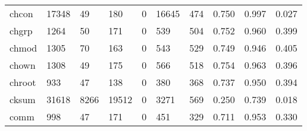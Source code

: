 \begin{longtable}{lp{2.0cm}p{2.0cm}p{2.0cm}p{2.0cm}p{2.0cm}p{2.0cm}p{2.0cm}p{2.0cm}p{2.0cm}}
chcon     &                  17348 &                                 49 &                               180 &                                0 &                             16645 &                             474 &                                   0.750 &                                  0.997 &                                0.027 \\
chgrp     &                   1264 &                                 50 &                               171 &                                0 &                               539 &                             504 &                                   0.752 &                                  0.960 &                                0.399 \\
chmod     &                   1305 &                                 70 &                               163 &                                0 &                               543 &                             529 &                                   0.749 &                                  0.946 &                                0.405 \\
chown     &                   1308 &                                 49 &                               175 &                                0 &                               566 &                             518 &                                   0.754 &                                  0.963 &                                0.396 \\
chroot    &                    933 &                                 47 &                               138 &                                0 &                               380 &                             368 &                                   0.737 &                                  0.950 &                                0.394 \\
cksum     &                  31618 &                               8266 &                             19512 &                                0 &                              3271 &                             569 &                                   0.250 &                                  0.739 &                                0.018 \\
comm      &                    998 &                                 47 &                               171 &                                0 &                               451 &                             329 &                                   0.711 &                                  0.953 &                                0.330 \\

\end{longtable}
